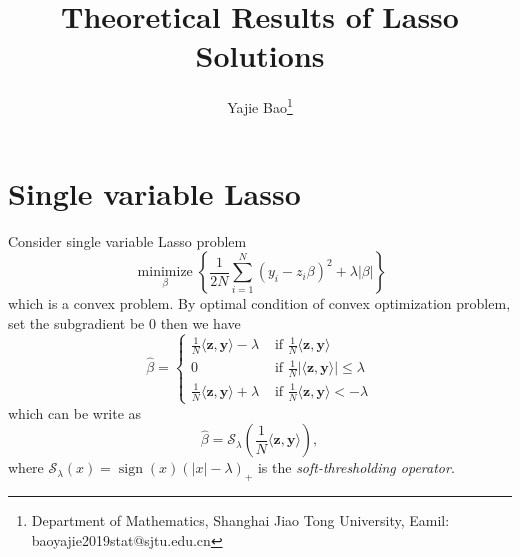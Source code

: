 \documentclass[12pt]{article}
\numberwithin{equation}{section}
\begin{document}
\title{Theoretical Results of Lasso Solutions}

\author{Yajie Bao\thanks{Department of Mathematics, Shanghai Jiao Tong University, Eamil: baoyajie2019stat@sjtu.edu.cn}}
\maketitle

\section{Single variable Lasso}
Consider single variable Lasso problem
\begin{equation}
\underset{\beta}{\operatorname{minimize}}\left\{\frac{1}{2 N} \sum_{i=1}^{N}\left(y_{i}-z_{i} \beta\right)^{2}+\lambda|\beta|\right\}
\end{equation}
which is a convex problem. By optimal condition of convex optimization problem, set the subgradient be 0 then we have
$$
\widehat{\beta}=\left\{\begin{array}{ll}{\frac{1}{N}\langle\mathbf{z}, \mathbf{y}\rangle-\lambda} & {\text { if } \frac{1}{N}\langle\mathbf{z}, \mathbf{y}\rangle} \\ { 0} & {\text { if } \frac{1}{N}|\langle\mathbf{z}, \mathbf{y}\rangle| \leq \lambda} \\ {\frac{1}{N}\langle\mathbf{z}, \mathbf{y}\rangle+\lambda} & {\text { if } \frac{1}{N}\langle\mathbf{z}, \mathbf{y}\rangle<-\lambda}\end{array}\right.
$$
which can be write as
$$
\widehat{\beta}=\mathcal{S}_{\lambda}\left(\frac{1}{N}\langle\mathbf{z}, \mathbf{y}\rangle\right),
$$
where $\mathcal{S}_{\lambda}(x) = \operatorname{sign}(x)(|x|-\lambda)_{+}$ is the \textit{soft-thresholding operator}.
\end{document}
